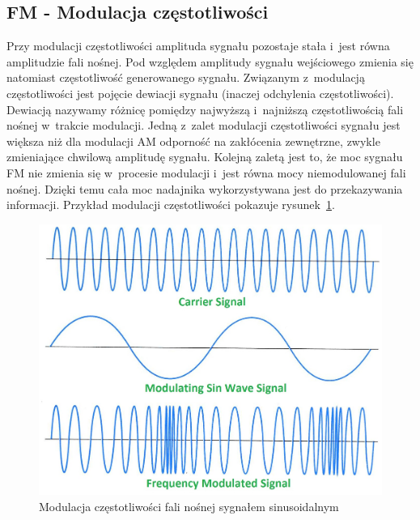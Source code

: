 \documentclass[eng,oneside]{mgr}
\begin{document}
			\subsection{FM - Modulacja częstotliwości}
			Przy modulacji częstotliwości amplituda sygnału pozostaje stała i~jest równa amplitudzie fali nośnej. Pod względem amplitudy sygnału wejściowego zmienia się natomiast częstotliwość generowanego sygnału. Związanym z~modulacją częstotliwości jest pojęcie dewiacji sygnału (inaczej odchylenia częstotliwości). Dewiacją nazywamy różnicę pomiędzy najwyższą i~najniższą częstotliwością fali nośnej w~trakcie modulacji. Jedną z~zalet modulacji częstotliwości sygnału jest większa niż dla modulacji AM odporność na zakłócenia zewnętrzne, zwykle zmieniające chwilową amplitudę sygnału. Kolejną zaletą jest to, że moc sygnału FM nie zmienia się w~procesie modulacji i~jest równa mocy niemodulowanej fali nośnej. Dzięki temu cała moc nadajnika wykorzystywana jest do przekazywania informacji. Przykład modulacji częstotliwości pokazuje rysunek~\ref{fig:fm_modulation}. 
			\begin{figure}[!htb]
				\begin{center}
					\includegraphics[scale=0.8]{modulacja_fm}
				\end{center}
				\caption{Modulacja częstotliwości fali nośnej sygnałem sinusoidalnym}
				\label{fig:fm_modulation}
			\end{figure}
		
\end{document}

